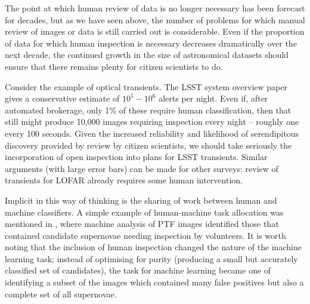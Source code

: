 \documentclass{ar2e}
\begin{document}



% 

The point at which human review of data is no longer necessary has been forecast
for decades, but as we have seen above, the number of problems for which
manual review of images or data is still carried out is considerable. Even if
the proportion of data for which human inspection is necessary decreases
dramatically over the next decade, the continued growth in the size of
astronomical datasets should ensure that there remains plenty for citizen
scientists to do. 

Consider the example of optical transients. The LSST system
overview paper \citep{LSSTsystem} gives a conservative estimate of $10^5-10^6$
alerts per night. Even if, after automated brokerage, only 1\% of these require
human classification, then that still might produce 10,000 images requiring
inspection every night -- roughly one every 100 seconds. Given the increased
reliability and likelihood of serendipitous discovery provided by review by
citizen scientists, we should take seriously the incorporation of open
inspection into plans for LSST transients. Similar arguments (with large error
bars) can be made for other surveys: review of transients for LOFAR
already requires some human intervention. 


Implicit in this way of thinking is the sharing of work between human and
machine classifiers. 
A simple example of human-machine task allocation was mentioned in
, where machine analysis of PTF images identified those
that contained candidate supernovae needing inspection by volunteers. It is
worth noting that the inclusion of human inspection changed the nature of the
machine learning task; instead of optimising for purity (producing a small but
accurately classified set of candidates), the task for machine learning became
one of identifying a subset of the images which contained many false positives
but also a complete set of all supernovae. 
\end{document}
